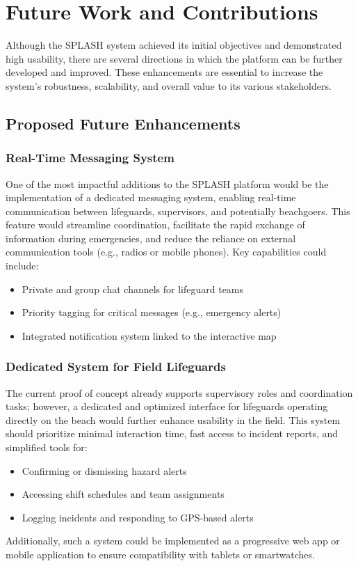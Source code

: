 \chapter{Future Work and Contributions}
\label{chapter:Future}

Although the SPLASH system achieved its initial objectives and demonstrated high usability, there are several directions in which the platform can be further developed and improved. These enhancements are essential to increase the system's robustness, scalability, and overall value to its various stakeholders.

\section{Proposed Future Enhancements}

\subsection{Real-Time Messaging System}
One of the most impactful additions to the SPLASH platform would be the implementation of a dedicated messaging system, enabling real-time communication between lifeguards, supervisors, and potentially beachgoers. This feature would streamline coordination, facilitate the rapid exchange of information during emergencies, and reduce the reliance on external communication tools (e.g., radios or mobile phones). Key capabilities could include:
\begin{itemize}
    \item Private and group chat channels for lifeguard teams
    \item Priority tagging for critical messages (e.g., emergency alerts)
    \item Integrated notification system linked to the interactive map
\end{itemize}

\subsection{Dedicated System for Field Lifeguards}
The current proof of concept already supports supervisory roles and coordination tasks; however, a dedicated and optimized interface for lifeguards operating directly on the beach would further enhance usability in the field. This system should prioritize minimal interaction time, fast access to incident reports, and simplified tools for:
\begin{itemize}
    \item Confirming or dismissing hazard alerts
    \item Accessing shift schedules and team assignments
    \item Logging incidents and responding to GPS-based alerts
\end{itemize}
Additionally, such a system could be implemented as a progressive web app or mobile application to ensure compatibility with tablets or smartwatches.

